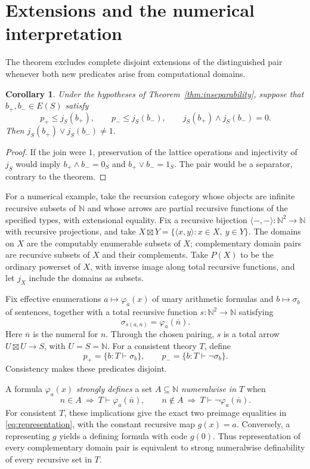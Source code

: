 \documentclass[11pt]{article}
\newtheorem{corollary}[theorem]{Corollary}
\theoremstyle{definition}
\begin{document}
\section{Extensions and the numerical interpretation}

The theorem excludes complete disjoint extensions of the distinguished
pair whenever both new predicates arise from computational domains.
\begin{corollary}\label{cor:extension}
Under the hypotheses of Theorem~\ref{thm:inseparability}, suppose that
$b_+,b_-\in E(S)$ satisfy
\[
 p_+\leq j_S(b_+),\qquad p_-\leq j_S(b_-),\qquad
 j_S(b_+)\wedge j_S(b_-)=0.
\]
Then $j_S(b_+)\vee j_S(b_-)\ne1$.
\end{corollary}
\begin{proof}
If the join were $1$, preservation of the lattice operations and
injectivity of $j_S$ would imply
$b_+\wedge b_-=0_S$ and $b_+\vee b_-=1_S$.
The pair would be a separator, contrary to the theorem.
\end{proof}

For a numerical example, take the recursion category whose objects are
infinite recursive subsets of $\mathbb N$ and whose arrows are partial
recursive functions of the specified types, with extensional equality.
Fix a recursive bijection $\langle-,-\rangle:\mathbb N^2\to\mathbb N$
with recursive projections, and take
$X\boxtimes Y=\{\langle x,y\rangle:x\in X,\ y\in Y\}$.
The domains on $X$ are the computably enumerable subsets of $X$;
complementary domain pairs are recursive subsets of $X$ and their complements.
Take $P(X)$ to be the ordinary
powerset of $X$, with inverse image along total recursive functions,
and let $j_X$ include the domains as subsets.

Fix effective enumerations $a\mapsto\varphi_a(x)$ of unary arithmetic
formulas and $b\mapsto\sigma_b$ of sentences, together with a total
recursive function $s:\mathbb N^2\to\mathbb N$ satisfying
\[
 \sigma_{s(a,n)}=\varphi_a(\overline n).
\]
Here $\overline n$ is the numeral for $n$. Through the chosen pairing,
$s$ is a total arrow $U\boxtimes U\to S$, with $U=S=\mathbb N$.
For a consistent theory $T$, define
\[
 p_+=\{b:T\vdash\sigma_b\},\qquad
 p_-=\{b:T\vdash\neg\sigma_b\}.
\]
Consistency makes these predicates disjoint.

A formula $\varphi_a(x)$ \emph{strongly defines} a set
$A\subseteq\mathbb N$ \emph{numeralwise in $T$} when
\[
 n\in A\ \Longrightarrow\ T\vdash\varphi_a(\overline n),
 \qquad
 n\notin A\ \Longrightarrow\ T\vdash\neg\varphi_a(\overline n).
\]
For consistent $T$, these implications give the exact two preimage
equalities in \eqref{eq:representation}, with the constant recursive
map $g(x)=a$. Conversely, a representing $g$ yields a defining formula
with code $g(0)$. Thus representation of every complementary domain
pair is equivalent to strong numeralwise definability of every recursive
set in $T$.
\end{document}
